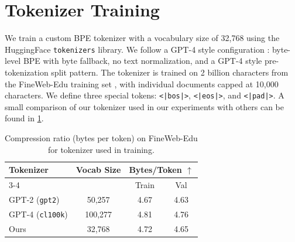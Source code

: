 \section{Tokenizer Training}
\label{sec:tokenizer}

We train a custom BPE tokenizer with a vocabulary size of 32,768 using the HuggingFace \texttt{tokenizers} library. We follow a GPT-4 style configuration \citep{openai2024gpt4technicalreport}: byte-level BPE with byte fallback, no text normalization, and a GPT-4 style pre-tokenization split pattern. The tokenizer is trained on 2 billion characters from the FineWeb-Edu training set \citep{penedo2024finewebdatasetsdecantingweb}, with individual documents capped at 10,000 characters. We define three special tokens: \texttt{<|bos|>}, \texttt{<|eos|>}, and \texttt{<|pad|>}. A small comparison of our tokenizer used in our experiments with others can be found in \cref{tab:tokenizer-compression}.

\begin{table}[h]
  \centering
  \small
  \begin{tabular}{lccc}
  \toprule
      \textbf{Tokenizer} & \textbf{Vocab Size} & \multicolumn{2}{c}{\textbf{Bytes/Token} $\uparrow$} \\
      \cmidrule(lr){3-4}
      & & Train & Val \\
  \midrule
      GPT-2 (\texttt{gpt2})       & 50{,}257  & 4.67 & 4.63 \\
      GPT-4 (\texttt{cl100k})     & 100{,}277 & 4.81 & 4.76 \\
      Ours                        & 32{,}768  & 4.72 & 4.65 \\
  \bottomrule
  \end{tabular}
  \caption{Compression ratio (bytes per token) on FineWeb-Edu for tokenizer used in training.}
  \label{tab:tokenizer-compression}
\end{table}
